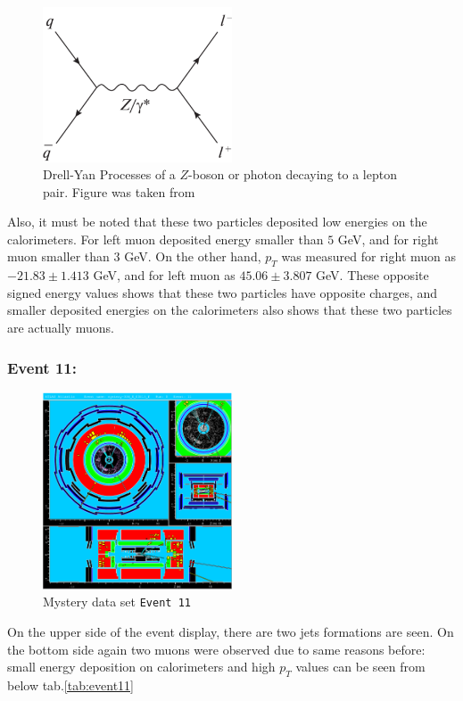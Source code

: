 \begin{figure}[h]
    \centering
	\includegraphics[width=0.5\textwidth]{../figures/DrellYan001.pdf}
	\caption{Drell-Yan Processes of a $Z$-boson or photon decaying to a lepton pair. Figure was taken from \cite{shalaev2021drellyan}}
    \label{fig:DrellYan001}
\end{figure}
\FloatBarrier
Also, it must be noted that these two particles deposited low energies on the calorimeters. For left muon deposited energy smaller than $5$ GeV, and for right muon smaller than $3$ GeV. On the other hand, $p_T$ was measured for right muon as $-21.83 \pm 1.413$ GeV, and for left muon as $45.06 \pm 3.807$ GeV. These opposite signed energy values shows that these two particles have opposite charges, and smaller deposited energies on the calorimeters  also shows that these two particles are actually muons.


\subsubsection{Event 11:}

\begin{figure}[h]
    \centering
    \includegraphics[width=0.5\textwidth]{../figures/mystery-event11.pdf}
	\caption{Mystery data set \texttt{Event 11}}
    \label{fig:event11}
\end{figure}
\FloatBarrier
On the upper side of the event display, there are two jets formations are seen. On the bottom side again two muons were observed due to same reasons before: small energy deposition on calorimeters and high $p_T$ values can be seen from below tab.\ref{tab:event11}

